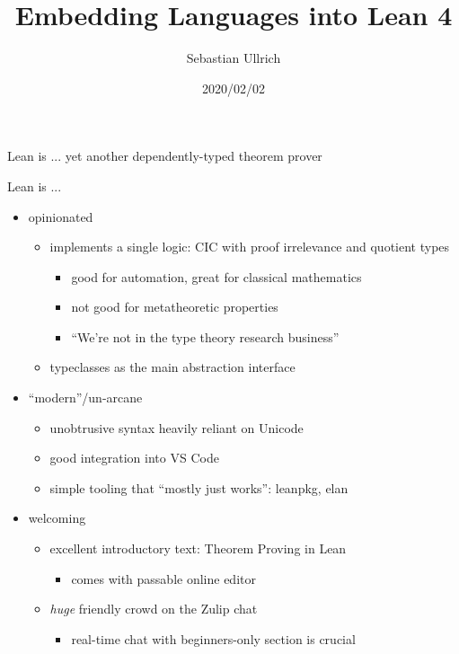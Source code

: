 \documentclass[t]{beamer}
\title{Embedding Languages into Lean 4}
\author[Ullrich]{Sebastian Ullrich}
\subtitle{\insertauthor}
\institute[IPD Snelting]{Programming paradigms group - IPD Snelting}
\date{2020/02/02}
\begin{document}
\begin{frame}
  \maketitle
\end{frame}

\begin{frame}{Lean is ...}
  yet another dependently-typed theorem prover
\end{frame}

\begin{frame}{Lean is ...}
  \begin{itemize}
  \item opinionated
    \begin{itemize}
    \item implements a single logic: CIC with proof irrelevance and quotient types
      \begin{itemize}
      \item good for automation, great for classical mathematics
      \item not good for metatheoretic properties \pause
      \item ``We're not in the type theory research business''
      \end{itemize}
      \pause
    \item typeclasses as the main abstraction interface
    \end{itemize}
    \pause\vfill
  \item ``modern''/un-arcane
    \begin{itemize}
    \item unobtrusive syntax heavily reliant on Unicode
    \item good integration into VS Code
    \item simple tooling that ``mostly just works'': leanpkg, elan
    \end{itemize}
    \pause\vfill
  \item welcoming
    \begin{itemize}
    \item excellent introductory text: Theorem Proving in Lean
      \begin{itemize}
      \item comes with passable online editor
      \end{itemize}
    \item \emph{huge} friendly crowd on the Zulip chat
      \begin{itemize}
      \item real-time chat with beginners-only section is crucial
      \end{itemize}
    \end{itemize}
  \end{itemize}
\end{frame}
\end{document}
